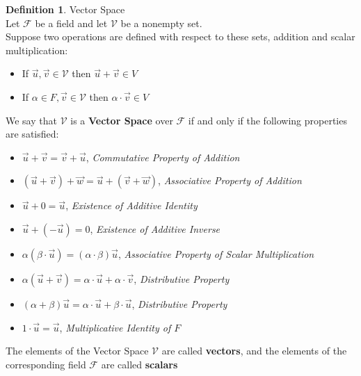\documentclass{book}
\theoremstyle{definition}
\newtheorem{definition}{Definition}[section]
\theoremstyle{remark}
\newcommand{\cc}[1]{\mathcal{#1}}
\newcommand{\m}{\cdot}
\begin{document}
\begin{definition}
Vector Space \\

    Let $\cc{F}$ be a field and let $\mathcal{V}$ be a nonempty set. \\
    Suppose two operations are defined with respect to these sets, addition and scalar multiplication: 
        \begin{itemize}
            \item If $\vec{u}, \vec{v} \in \mathcal{V}$ then $\vec{u} + \vec{v} \in V$
            \item If $\alpha \in F, \vec{v} \in \mathcal{V}$ then $\alpha \m \vec{v} \in V$
        \end{itemize}
    We say that $\mathcal{V}$ is a \textbf{Vector Space} over $\cc{F}$ if and only if the following properties are satisfied:
        \begin{itemize}
            \item $\vec{u} + \vec{v} = \vec{v} + \vec{u}$, \textit{Commutative Property of Addition}        
            \item $(\vec{u} + \vec{v}) + \vec{w} = \vec{u} + (\vec{v} + \vec{w})$, \textit{Associative Property of Addition}          
            \item $\vec{u} + 0 = \vec{u} $, \textit{Existence of Additive Identity}         
            \item $\vec{u} + (-\vec{u}) = 0$, \textit{Existence of Additive Inverse}
            \item $\alpha (\beta \m \vec{u}) = (\alpha \m \beta)\vec{u}$, \textit{Associative Property of Scalar Multiplication} 
            \item $\alpha(\vec{u} + \vec{v}) = \alpha \m \vec{u} + \alpha \m \vec{v}$, \textit{Distributive Property}
            \item $ (\alpha + \beta)\vec{u} = \alpha \m \vec{u} + \beta \m \vec{u} $, \textit{Distributive Property}    
            \item $ 1 \m \vec{u} = \vec{u}$, \textit{Multiplicative Identity of $F$}  
         \end{itemize}
    The elements of the Vector Space \footnotemark $\mathcal{V}$ are called \textbf{vectors}, and the elements of the corresponding field $\cc{F}$ are called \textbf{scalars}
    
\end{definition}
\end{document}
